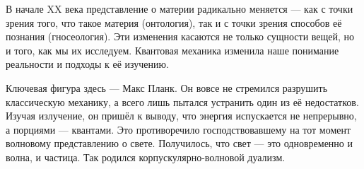 

В начале XX века представление о материи радикально меняется --- как с точки зрения того, что такое материя (онтология), так и с точки зрения способов её познания (гносеология). Эти изменения касаются не только сущности вещей, но и того, как мы их исследуем. Квантовая механика изменила наше понимание реальности и подходы к её изучению.

Ключевая фигура здесь --- Макс Планк. Он вовсе не стремился разрушить классическую механику, а всего лишь пытался устранить один из её недостатков. Изучая излучение, он пришёл к выводу, что энергия испускается не непрерывно, а порциями --- квантами. Это противоречило господствовавшему на тот момент волновому представлению о свете. Получилось, что свет --- это одновременно и волна, и частица. Так родился корпускулярно-волновой дуализм.

